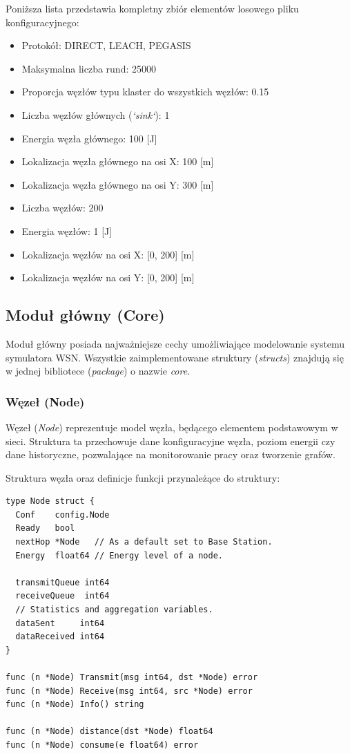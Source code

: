 \documentclass[a4paper,12pt,twoside,openany]{report}
\begin{document}
Poniższa lista przedstawia kompletny zbiór elementów losowego pliku konfiguracyjnego:

\begin{itemize}[noitemsep]
 \item Protokół: DIRECT, LEACH, PEGASIS
 \item Maksymalna liczba rund: 25000
 \item Proporcja węzłów typu klaster do wszystkich węzłów: 0.15
 \item Liczba węzłów głównych (\textit{`sink`}): 1
 \item Energia węzła głównego: 100 [J]
 \item Lokalizacja węzła głównego na osi X: 100 [m]
 \item Lokalizacja węzła głównego na osi Y: 300 [m]
 \item Liczba węzłów: 200
 \item Energia węzłów: 1 [J]
 \item Lokalizacja węzłów na osi X: [0, 200] [m]
 \item Lokalizacja węzłów na osi Y: [0, 200] [m]
\end{itemize}

\subsection{Moduł główny (Core)}

Moduł główny posiada najważniejsze cechy umożliwiające modelowanie systemu symulatora WSN.
Wszystkie zaimplementowane struktury (\textit{structs}) znajdują się w jednej bibliotece (\textit{package}) o nazwie \textit{core}.

\subsubsection{Węzeł (Node)}

Węzeł (\textit{Node}) reprezentuje model węzła, będącego elementem podstawowym w sieci. Struktura ta przechowuje dane konfiguracyjne węzła,
poziom energii czy dane historyczne, pozwalające na monitorowanie pracy oraz tworzenie grafów.

Struktura węzła oraz definicje funkcji przynależące do struktury:

\begin{lstlisting}
type Node struct {
  Conf    config.Node
  Ready   bool
  nextHop *Node   // As a default set to Base Station.
  Energy  float64 // Energy level of a node.

  transmitQueue int64
  receiveQueue  int64
  // Statistics and aggregation variables.
  dataSent     int64
  dataReceived int64
}

func (n *Node) Transmit(msg int64, dst *Node) error
func (n *Node) Receive(msg int64, src *Node) error
func (n *Node) Info() string

func (n *Node) distance(dst *Node) float64
func (n *Node) consume(e float64) error
\end{lstlisting}
\end{document}
